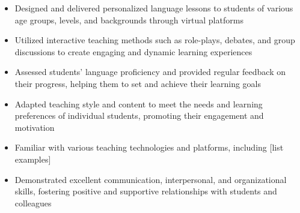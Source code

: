 \documentclass[
    10pt,
    A4,
    english,
    draft = false,
    twoside = false,
]{article}
\begin{document}
	{
    \begin{itemize}
      \item Designed and delivered personalized language lessons to students of various age groups, levels, and backgrounds through virtual platforms
      \item Utilized interactive teaching methods such as role-plays, debates, and group discussions to create engaging and dynamic learning experiences
      \item Assessed students' language proficiency and provided regular feedback on their progress, helping them to set and achieve their learning goals
      \item Adapted teaching style and content to meet the needs and learning preferences of individual students, promoting their engagement and motivation
      \item Familiar with various teaching technologies and platforms, including [list examples]
      \item Demonstrated excellent communication, interpersonal, and organizational skills, fostering positive and supportive relationships with students and colleagues 
    \end{itemize}
    }
	
\end{document}
